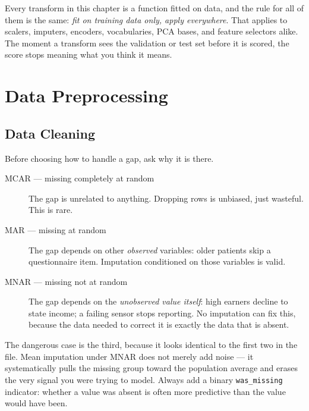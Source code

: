 \begin{engineernote}
Every transform in this chapter is a function fitted on data, and the rule for
all of them is the same: \emph{fit on training data only, apply everywhere}.
That applies to scalers, imputers, encoders, vocabularies, PCA bases, and
feature selectors alike. The moment a transform sees the validation or test set
before it is scored, the score stops meaning what you think it means.
\end{engineernote}

\section{Data Preprocessing}

\subsection{Data Cleaning}

\begin{cautionbox}
Before choosing how to handle a gap, ask why it is there.
\begin{description}
  \item[MCAR --- missing completely at random] The gap is unrelated to
    anything. Dropping rows is unbiased, just wasteful. This is rare.
  \item[MAR --- missing at random] The gap depends on other \emph{observed}
    variables: older patients skip a questionnaire item. Imputation
    conditioned on those variables is valid.
  \item[MNAR --- missing not at random] The gap depends on the \emph{unobserved
    value itself}: high earners decline to state income; a failing sensor stops
    reporting. No imputation can fix this, because the data needed to correct
    it is exactly the data that is absent.
\end{description}
The dangerous case is the third, because it looks identical to the first two in
the file. Mean imputation under MNAR does not merely add noise --- it
systematically pulls the missing group toward the population average and erases
the very signal you were trying to model. Always add a binary
\texttt{was\_missing} indicator: whether a value was absent is often more
predictive than the value would have been.
\end{cautionbox}

